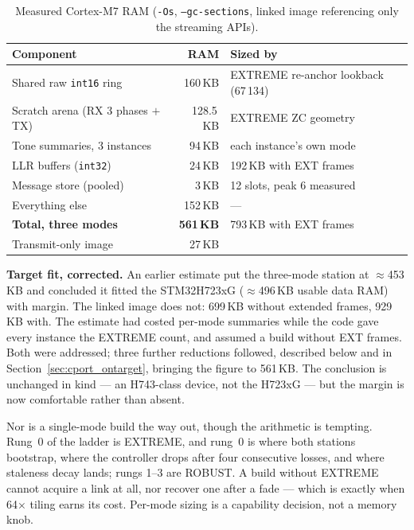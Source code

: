 \begin{table}[H]
    \centering
    \caption{Measured Cortex-M7 RAM (\texttt{-Os}, \texttt{--gc-sections},
             linked image referencing only the streaming APIs).}
    \label{tab:cport_ram}
    \small
    \begin{tabular}{@{}lrl@{}}
    \toprule
    \textbf{Component} & \textbf{RAM} & \textbf{Sized by} \\
    \midrule
    Shared raw \texttt{int16} ring & 160\,KB & EXTREME re-anchor
                                               lookback (67\,134) \\
    Scratch arena (RX 3 phases $+$ TX) & 128.5\,KB & EXTREME ZC
                                                     geometry \\
    Tone summaries, 3 instances & 94\,KB & each instance's own mode \\
    LLR buffers (\texttt{int32}) & 24\,KB & 192\,KB with EXT frames \\
    Message store (pooled) & 3\,KB & 12 slots, peak 6 measured \\
    Everything else & 152\,KB & --- \\
    \midrule
    \textbf{Total, three modes} & \textbf{561\,KB} & 793\,KB with EXT
                                                     frames \\
    Transmit-only image & 27\,KB & \\
    \bottomrule
    \end{tabular}
\end{table}

\textbf{Target fit, corrected.} An earlier estimate put the three-mode
station at $\approx$453\,KB and concluded it fitted the STM32H723xG
($\approx$496\,KB usable data RAM) with margin. The linked image does
not: 699\,KB without extended frames, 929\,KB with. The estimate had
costed per-mode summaries while the code gave every instance the
EXTREME count, and assumed a build without EXT frames. Both were
addressed; three further reductions followed, described below and in
Section~\ref{sec:cport_ontarget}, bringing the figure to 561\,KB. The
conclusion is unchanged in kind --- an H743-class device, not the
H723xG --- but the margin is now comfortable rather than absent.

Nor is a single-mode build the way out, though the arithmetic is
tempting. Rung~0 of the ladder is EXTREME, and rung~0 is where both
stations bootstrap, where the controller drops after four consecutive
losses, and where staleness decay lands; rungs 1--3 are ROBUST. A build
without EXTREME cannot acquire a link at all, nor recover one after a
fade --- which is exactly when 64$\times$ tiling earns its cost.
Per-mode sizing is a capability decision, not a memory knob.

